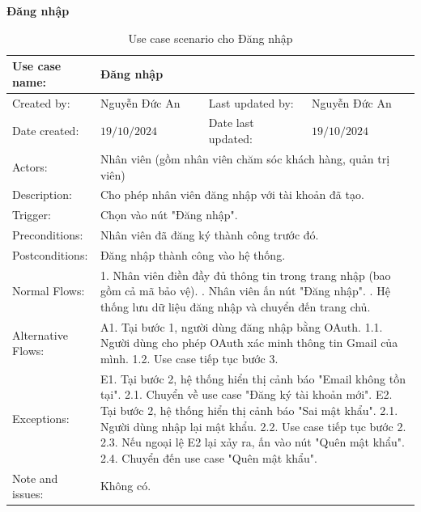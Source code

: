 \textbf{Đăng nhập}
\begin{table}[H]
	\centering
	\begin{tabular}{|l|l|l|l|} 
		\hline Use case name: & \multicolumn{3}{|l|}{Đăng nhập} \\ 
		\hline Created by: & Nguyễn Đức An & Last updated by: & Nguyễn Đức An \\ 
		\hline Date created: & $19 / 10 / 2024$ & Date last updated: & $19 / 10 / 2024$\\ 
		\hline Actors: & \multicolumn{3}{|l|}{ Nhân viên (gồm nhân viên chăm sóc khách hàng, quản trị viên) } \\ 
		\hline Description: & \multicolumn{3}{|p{12cm}|}{ Cho phép nhân viên đăng nhập với tài khoản đã tạo. } \\ 
		\hline Trigger: & \multicolumn{3}{|p{12cm}|}{ Chọn vào nút "Đăng nhập". } \\ 
		\hline Preconditions: & \multicolumn{3}{|p{12cm}|}{ Nhân viên đã đăng ký thành công trước đó. } \\ 
		\hline Postconditions: & \multicolumn{3}{|p{12cm}|}{ Đăng nhập thành công vào hệ thống. } \\ 
		\hline Normal Flows: & \multicolumn{3}{|p{12cm}|}{
			1. Nhân viên điền đầy đủ thông tin trong trang nhập (bao gồm cả mã bảo vệ). \newline
			2. Nhân viên ấn nút "Đăng nhập". \newline
			3. Hệ thống lưu dữ liệu đăng nhập và chuyển đến trang chủ. 
		} \\ 
		\hline Alternative Flows: & \multicolumn{3}{|p{12cm}|}{
			A1. Tại bước 1, người dùng đăng nhập bằng OAuth. \newline
			\hspace{0.5cm}1.1. Người dùng cho phép OAuth xác minh thông tin Gmail của mình. \newline
			\hspace{0.5cm}1.2. Use case tiếp tục bước 3. 
		} \\ 
		\hline Exceptions: & \multicolumn{3}{|p{12cm}|}{
			E1. Tại bước 2, hệ thống hiển thị cảnh báo "Email không tồn tại". \newline
			\hspace{0.5cm}2.1. Chuyển về use case "Đăng ký tài khoản mới". \newline
			E2. Tại bước 2, hệ thống hiển thị cảnh báo "Sai mật khẩu". \newline
			\hspace{0.5cm}2.1. Người dùng nhập lại mật khẩu. \newline
			\hspace{0.5cm}2.2. Use case tiếp tục bước 2. \newline
			\hspace{0.5cm}2.3. Nếu ngoại lệ E2 lại xảy ra, ấn vào nút "Quên mật khẩu". \newline
			\hspace{0.5cm}2.4. Chuyển đến use case "Quên mật khẩu". 
		} \\ 
		\hline Note and issues: & \multicolumn{3}{|p{12cm}|}{ Không có. } \\ 
		\hline
	\end{tabular}
	\caption{Use case scenario cho Đăng nhập}
\end{table}


